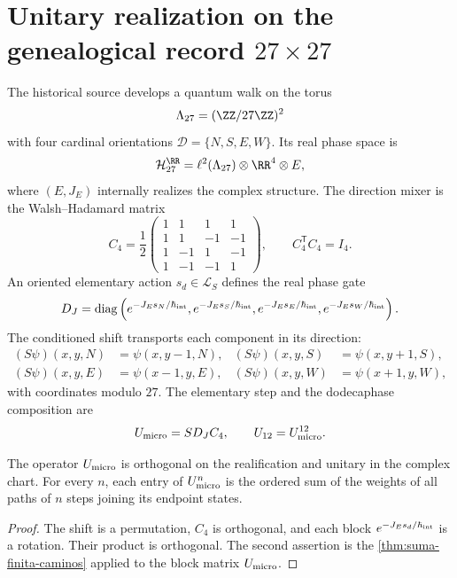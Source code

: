 \section{Unitary realization on the genealogical record \(27\times27\)}

The historical source develops a quantum walk on the torus
\[
 \Lambda_{27}=(\ZZ/27\ZZ)^2
\]
with four cardinal orientations \(\mathcal D=\{N,S,E,W\}\). Its real phase space is
\[
 \mathcal H_{27}^{\RR}
 =\ell^2(\Lambda_{27})\otimes\RR^4\otimes E,
\]
where \((E,J_E)\) internally realizes the complex structure. The direction
mixer is the Walsh--Hadamard matrix
\[
 C_4=\frac12
 \begin{pmatrix}
 1&1&1&1\\
 1&1&-1&-1\\
 1&-1&1&-1\\
 1&-1&-1&1
 \end{pmatrix},
 \qquad C_4^{\mathsf T}C_4=I_4.
\]
An oriented elementary action \(s_d\in\mathcal L_S\) defines the real
phase gate
\[
 D_J=\operatorname{diag}
 \left(
  e^{-J_Es_N/\hbar_{\rm int}},
  e^{-J_Es_S/\hbar_{\rm int}},
  e^{-J_Es_E/\hbar_{\rm int}},
  e^{-J_Es_W/\hbar_{\rm int}}
 \right).
\]
The conditioned shift transports each component in its direction:
\begin{align*}
 (S\psi)(x,y,N)&=\psi(x,y-1,N),&
 (S\psi)(x,y,S)&=\psi(x,y+1,S),\\
 (S\psi)(x,y,E)&=\psi(x-1,y,E),&
 (S\psi)(x,y,W)&=\psi(x+1,y,W),
\end{align*}
with coordinates modulo \(27\). The elementary step and the dodecaphase
composition are
\begin{equation}
 U_{\rm micro}=S D_J C_4,
 \qquad
 U_{12}=U_{\rm micro}^{12}.
 \label{eq:unitario-ledger-27}
\end{equation}

\begin{proposition}
The operator \(U_{\rm micro}\) is orthogonal on the realification and unitary in
the complex chart. For every \(n\), each entry of \(U_{\rm micro}^n\) is
the ordered sum of the weights of all paths of \(n\) steps joining
its endpoint states.
\end{proposition}

\begin{proof}
The shift is a permutation, \(C_4\) is orthogonal, and each block
\(e^{-J_Es_d/\hbar_{\rm int}}\) is a rotation. Their product is orthogonal.
The second assertion is the
\cref{thm:suma-finita-caminos} applied to the block matrix
\(U_{\rm micro}\).
\end{proof}

